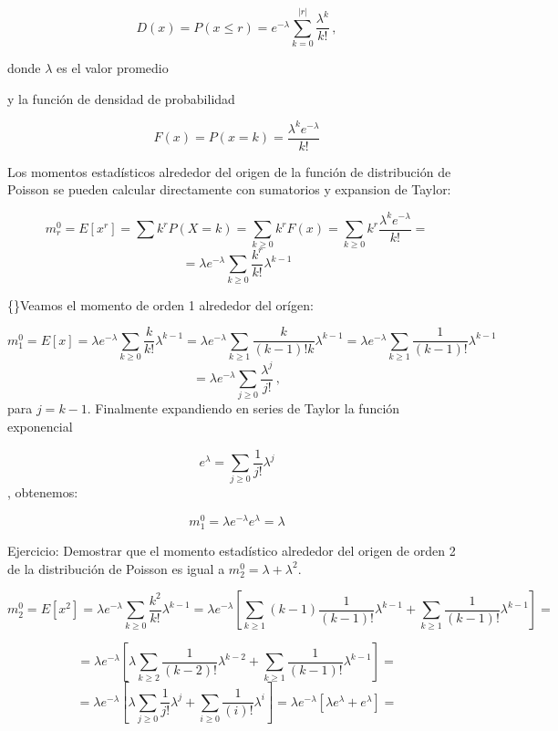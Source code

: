 \documentclass[
]{agujournal2019}
\begin{document}
\[D(x)=P(x \le r)=e^{-\lambda}\sum^{|r|}_{k=0}\frac{\lambda^k}{k!}\,,\]

donde \(\lambda\) es el valor promedio

\begin{center}
\end{center}

y la función de densidad de probabilidad

\[F(x)=P(x=k)=\frac{{\lambda}^k e^{-\lambda}}{k!}\]

\begin{center}
\end{center}

Los momentos estadísticos alrededor del origen de la función de
distribución de Poisson se pueden calcular directamente con sumatorios y
expansion de Taylor:

\[m^0_r=E[x^r]=\sum k^r P(X=k)=\sum_{k\ge0} k^rF(x)= \sum_{k\ge0} k^r\frac{{\lambda}^k e^{-\lambda}}{k!}=\]
\[=\lambda e^{-\lambda}\sum_{k \ge 0}\frac{k^r}{k!}\lambda^{k-1}\]

\{\noindent\}Veamos el momento de orden 1 alrededor del orígen:

\[m^0_1=E[x]=\lambda e^{-\lambda}\sum_{k \ge 0}\frac{k}{k!}\lambda^{k-1}=
 \lambda e^{-\lambda}\sum_{k \ge 1}\frac{k}{(k-1)!k}\lambda^{k-1}=
 \lambda e^{-\lambda}\sum_{k \ge 1}\frac{1}{(k-1)!}\lambda^{k-1}\]
\[=\lambda e^{-\lambda}\sum_{j \ge 0}\frac{\lambda^{j}}{j!}\,,\] para
\(j=k-1\). Finalmente expandiendo en series de Taylor la función
exponencial

\[e^{\lambda}=\sum_{j \ge 0}\frac{1}{j!}\lambda^{j}\], obtenemos:

\[m^0_1=\lambda e^{-\lambda}e^{\lambda}=\lambda\]

Ejercicio: Demostrar que el momento estadístico alrededor del origen de
orden 2 de la distribución de Poisson es igual a
\(m^0_2=\lambda+\lambda^2\).

\[m^0_2=E[x^2]=\lambda e^{-\lambda}\sum_{k \ge 0}\frac{k^2}{k!}\lambda^{k-1}=
               \lambda e^{-\lambda}\left[ \sum_{k \ge 1}(k-1)\frac{1}{(k-1)!}\lambda^{k-1} +
                                      \sum_{k \ge 1} \frac{1} {(k-1)!} \lambda^{k-1} \right]=\]

\[= \lambda e^{-\lambda}\left[ \lambda \sum_{k \ge 2}\frac{1}{(k-2)!}\lambda^{k-2} + \sum_{k \ge 1}\frac{1}{(k-1)!}\lambda^{k-1}\right]=\]
\[= \lambda e^{-\lambda}\left[ \lambda \sum_{j \ge 0}\frac{1}{j!}\lambda^{j} + \sum_{i \ge 0}\frac{1}{(i)!}\lambda^{i}\right]=
\lambda e^{-\lambda} \left[\lambda e^{\lambda} + e^{\lambda}\right]=\]
\end{document}
